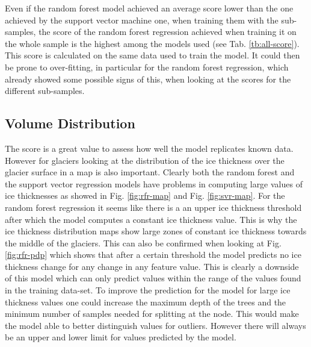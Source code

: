 Even if the random forest model achieved an average score lower than the one achieved by the support vector machine one, when training them with the sub-samples, the score of the random forest regression achieved when training it on the whole sample is the highest among the models used (see Tab. \ref{tb:all-score}). This score is calculated on the same data used to train the model. It could then be prone to over-fitting, in particular for the random forest regression, which already showed some possible signs of this, when looking at the scores for the different sub-samples.

\subsection{Volume Distribution}\label{disc-vol-dist}
The score is a great value to assess how well the model replicates known data. However for glaciers looking at the distribution of the ice thickness over the glacier surface in a map is also important. Clearly both the random forest and the support vector regression models have problems in computing large values of ice thicknesses as showed in Fig. \ref{fig:rfr-map} and Fig. \ref{fig:svr-map}. For the random forest regression it seems like there is a an upper ice thickness threshold after which the model computes a constant ice thickness value. This is why the ice thickness distribution maps show large zones of constant ice thickness towards the middle of the glaciers. This can also be confirmed when looking at Fig. \ref{fig:rfr-pdp} which shows that after a certain threshold the model predicts no ice thickness change for any change in any feature value. This is clearly a downside of this model which can only predict values within the range of the values found in the training data-set. To improve the prediction for the model for large ice thickness values one could increase the maximum depth of the trees and the minimum number of samples needed for splitting at the node. This would make the model able to better distinguish values for outliers. However there will always be an upper and lower limit for values predicted by the model.

